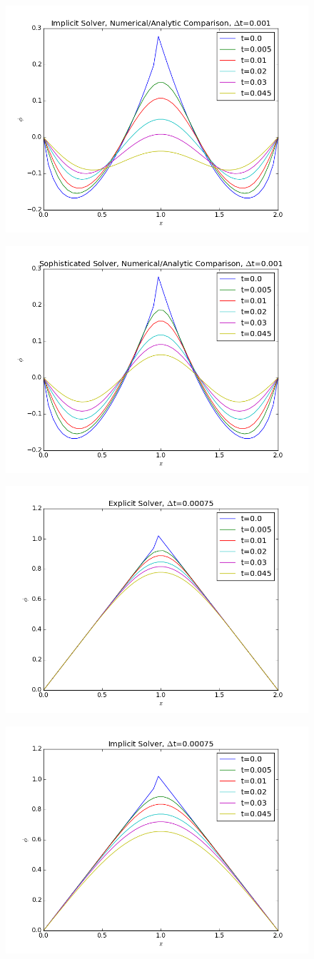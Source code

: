 \documentclass[10pt,letter]{article}
\begin{document}
\begin{figure}[H]
  \centering
    \includegraphics[width=.6\textwidth]{homework7_problem2_plot4}
\end{figure}
\begin{figure}[H]
  \centering
    \includegraphics[width=.6\textwidth]{homework7_problem2_plot5}
\end{figure}
\begin{figure}[H]
  \centering
    \includegraphics[width=.6\textwidth]{homework7_problem2_plot6}
\end{figure}
\begin{figure}[H]
  \centering
    \includegraphics[width=.6\textwidth]{homework7_problem2_plot7}
\end{figure}
\end{document}
